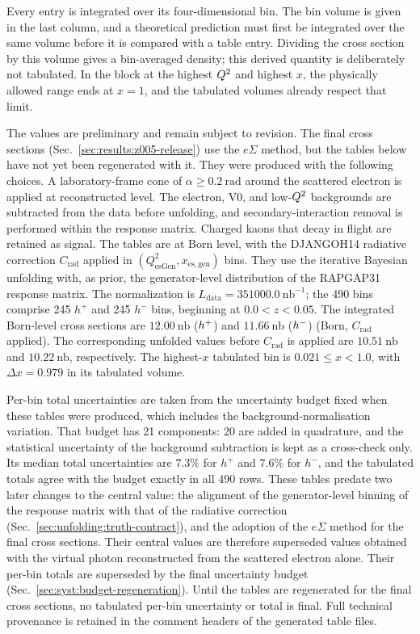 Every entry is integrated over its four-dimensional bin.  The bin volume is
given in the last column, and a theoretical prediction must first be integrated
over the same volume before it is compared with a table entry.  Dividing the
cross section by this volume gives a bin-averaged density; this derived quantity
is deliberately not tabulated.  In the block at the highest $Q^{2}$ and highest
$x$, the physically allowed range ends at $x=1$, and the tabulated volumes
already respect that limit.

The values are preliminary and remain subject to revision.  The final cross
sections (Sec.~\ref{sec:results:z005-release}) use the $e\Sigma$ method, but the
tables below have not yet been regenerated with it.  They were produced with the
following choices.  A laboratory-frame cone of $\alpha\ge0.2~\mathrm{rad}$ around
the scattered electron is applied at reconstructed level.  The electron, V0, and
low-$Q^{2}$ backgrounds are subtracted from the data before unfolding, and
secondary-interaction removal is performed within the response matrix.  Charged
kaons that decay in flight are retained as signal.  The tables are at Born level,
with the DJANGOH14 radiative correction $C_{\mathrm{rad}}$ applied in
$(Q^2_{\mathrm{esGen}},x_{\mathrm{es,gen}})$ bins.  They use the
iterative Bayesian unfolding with, as prior, the generator-level distribution of
the RAPGAP31 response matrix.  The normalization is
$L_{\mathrm{data}}=351000.0~\mathrm{nb}^{-1}$; the 490 bins comprise 245 $h^+$ and
245 $h^-$ bins, beginning at $0.0<z<0.05$.  The integrated Born-level cross
sections are $12.00~\mathrm{nb}$ ($h^{+}$) and $11.66~\mathrm{nb}$ ($h^{-}$)
(Born, $C_{\mathrm{rad}}$ applied).  The corresponding unfolded values before
$C_{\mathrm{rad}}$ is applied are $10.51~\mathrm{nb}$ and $10.22~\mathrm{nb}$,
respectively.  The highest-$x$ tabulated bin is $0.021\leq x<1.0$, with
$\Delta x=0.979$ in its tabulated volume.

Per-bin total uncertainties are taken from the uncertainty budget fixed when
these tables were produced, which includes the background-normalisation
variation.  That budget has 21 components: 20 are added in quadrature, and the
statistical uncertainty of the background subtraction is kept as a cross-check
only.  Its median total uncertainties are $7.3\%$ for $h^+$ and $7.6\%$ for
$h^-$, and the tabulated totals agree with the budget exactly in all 490 rows.
These tables predate two later changes to the central value: the alignment of
the generator-level binning of the response matrix with that of the radiative
correction (Sec.~\ref{sec:unfolding:truth-contract}), and the adoption of the
$e\Sigma$ method for the final cross sections.  Their central values are
therefore superseded values obtained with the virtual photon reconstructed from
the scattered electron alone.  Their per-bin totals are superseded by the final
uncertainty budget (Sec.~\ref{sec:syst:budget-regeneration}).  Until the tables
are regenerated for the final cross sections, no tabulated per-bin uncertainty or
total is final.  Full technical provenance is retained in the comment headers of
the generated table files.

